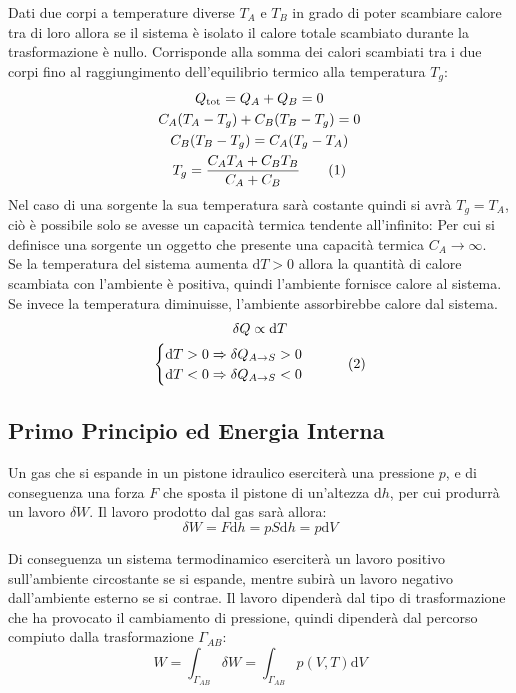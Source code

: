 \documentclass{article}
\newcommand{\df}{\mathrm{d}}
\numberwithin{equation}{subsection}
\begin{document}
Dati due corpi a temperature diverse $T_A$ e $T_B$ in grado di poter scambiare calore tra di loro allora
se il sistema è isolato il calore totale scambiato 
durante la trasformazione è nullo. Corrisponde alla  
somma dei calori scambiati tra i due corpi fino al raggiungimento dell'equilibrio termico alla temperatura $T_g$:
\begin{gather*}
    Q_\mathrm{tot}=Q_A+Q_B=0\\
    C_A(T_A-T_g)+C_B(T_B-T_g)=0\\
    C_B(T_B-T_g)=C_A(T_g-T_A)\\
    T_g=\displaystyle\frac{C_AT_A+C_BT_B}{C_A+C_B}\tag{\stepcounter{equation}\theequation}
\end{gather*}
Nel caso di una sorgente la sua temperatura sarà costante 
quindi si avrà $T_g=T_A$, ciò è possibile solo se avesse 
un capacità termica tendente all'infinito: Per cui si definisce 
una sorgente un oggetto che presente una capacità termica $C_A\to\infty$. 
\\
Se la temperatura del sistema aumenta $\df T>0$ allora la 
quantità di calore scambiata con l'ambiente è positiva, 
quindi l'ambiente fornisce calore al sistema. Se invece la 
temperatura diminuisse, l'ambiente assorbirebbe calore dal 
sistema.
\begin{gather*}
    \delta Q\propto \df T\\
    \begin{cases}
        \df T>0\Rightarrow\delta Q_{A\to S}>0\\
        \df T<0\Rightarrow\delta Q_{A\to S}<0
    \end{cases}\tag{\stepcounter{equation}\theequation}
\end{gather*}

\subsection{Primo Principio ed Energia Interna}
Un gas che si espande in un pistone idraulico eserciterà una pressione $p$, e di conseguenza una forza $F$ 
che sposta il pistone di un'altezza $\df h$, per cui produrrà un lavoro $\delta W$. 
Il lavoro prodotto dal gas sarà allora:
\begin{equation}
    \delta W=F\df h=pS\df h=p\df V
\end{equation}



Di conseguenza un sistema termodinamico eserciterà un lavoro positivo
sull'ambiente circostante se si espande, mentre subirà un 
lavoro negativo dall'ambiente esterno se si contrae. 
Il lavoro dipenderà dal tipo di trasformazione che ha provocato il cambiamento di pressione, quindi dipenderà dal percorso compiuto dalla trasformazione $\Gamma_{AB}$:
\begin{equation}
    W=\int_{\Gamma_{AB}}\delta W=\int_{\Gamma_{AB}}p(V,T)\df V
\end{equation}
\end{document}
